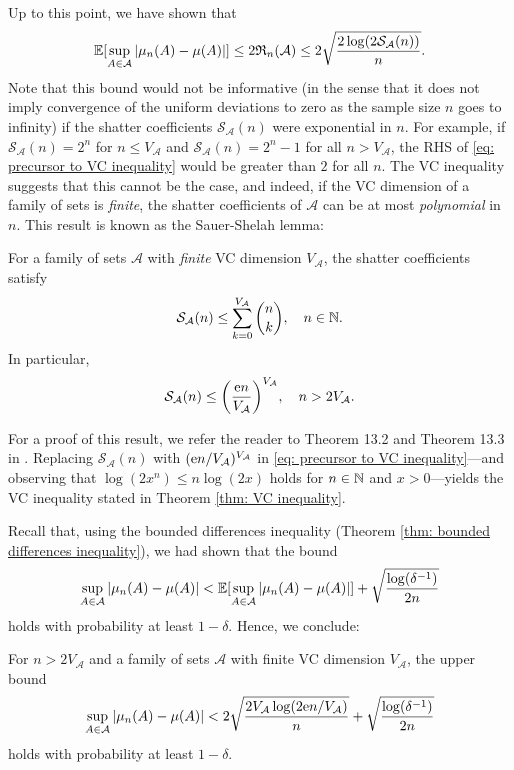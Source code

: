 Up to this point, we have shown that
\begin{equation}
\label{eq: precursor to VC inequality}
    \operatorname{\mathbb{E}}[\sup_{A \in \mathcal{A}} \abs{\mu_n(A) - \mu(A)}] \leq 2 \mathfrak{R}_n(\mathcal{A}) \leq 2 \sqrt{\frac{2 \log(2 \mathcal{S}_{\mathcal{A}}(n))}{n}}.
\end{equation}
Note that this bound would not be informative (in the sense that it does not imply convergence of the uniform deviations to zero as the sample size $n$ goes to infinity) if the shatter coefficients $\mathcal{S}_{\mathcal{A}}(n)$ were exponential in $n$. For example, if $\mathcal{S}_{\mathcal{A}}(n) = 2^n$ for $n \leq V_{\mathcal{A}}$ and $\mathcal{S}_{\mathcal{A}}(n) = 2^n - 1$ for all $n > V_{\mathcal{A}}$, the RHS of \eqref{eq: precursor to VC inequality} would be greater than $2$ for all $n$. The VC inequality suggests that this cannot be the case, and indeed, if the VC dimension of a family of sets is \emph{finite}, the shatter coefficients of $\mathcal{A}$ can be at most \emph{polynomial} in $n$. This result is known as the Sauer-Shelah lemma:

\begin{lemma}
\label{lem: sauer-shelah}
For a family of sets $\mathcal{A}$ with \emph{finite} VC dimension $V_{\mathcal{A}}$, the shatter coefficients satisfy
\[
    \mathcal{S}_{\mathcal{A}}(n) \leq \sum_{k=0}^{V_{\mathcal{A}}} \binom{n}{k}, \quad n \in \mathbb{N}.
\]
In particular,
\[
    \mathcal{S}_{\mathcal{A}}(n) \leq \left(\frac{\e n}{V_{\mathcal{A}}}\right)^{V_{\mathcal{A}}}, \quad n > 2 V_{\mathcal{A}}.
\]
\end{lemma}

For a proof of this result, we refer the reader to Theorem 13.2 and Theorem 13.3 in \cite[pp.~216--218]{devroye1996probabilistic}. Replacing $\mathcal{S}_{\mathcal{A}}(n)$ with $(\mathrm{e} n / V_{\mathcal{A}})^{V_{\mathcal{A}}}$ in \eqref{eq: precursor to VC inequality}---and observing that $\log(2x^n) \leq n \log(2x)$ holds for $n \in \mathbb{N}$ and $x > 0$---yields the VC inequality stated in Theorem \ref{thm: VC inequality}.

Recall that, using the bounded differences inequality (Theorem \ref{thm: bounded differences inequality}), we had shown that the bound
\[
    \sup_{A \in \mathcal{A}} \abs{\mu_n(A) - \mu(A)} < \operatorname{\mathbb{E}}[\sup_{A \in \mathcal{A}} \abs{\mu_n(A) - \mu(A)}] + \sqrt{\frac{\log(\delta^{-1})}{2n}}
\]
holds with probability at least $1 - \delta$. Hence, we conclude:

\begin{corollary}[VC Inequality]
\label{cor: VC inequality}
For $n > 2 V_{\mathcal{A}}$ and a family of sets $\mathcal{A}$ with finite VC dimension $V_{\mathcal{A}}$, the upper bound
\[
    \sup_{A \in \mathcal{A}} \abs{\mu_n(A) - \mu(A)} < 2 \sqrt{\frac{2 V_{\mathcal{A}} \log(2 \mathrm{e} n / V_{\mathcal{A}})}{n}} + \sqrt{\frac{\log(\delta^{-1})}{2n}}
\]
holds with probability at least $1 - \delta$.
\end{corollary}

